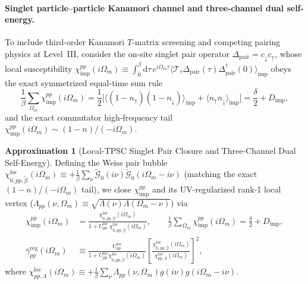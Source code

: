 \documentclass[11pt,a4paper]{article}
\numberwithin{equation}{section}
\theoremstyle{plain}
\theoremstyle{definition}
\newtheorem{approximation}{Approximation}[section]
\providecommand{\dd}{\mathrm{d}}
\begin{document}
\paragraph{Singlet particle--particle Kanamori channel and three-channel dual self-energy.}
To include third-order Kanamori $T$-matrix screening and competing pairing physics at
Level~III, consider the on-site singlet pair operator
$\Delta_{\mathrm{pair}} = c_\downarrow c_\uparrow$, whose local susceptibility
$\chi_{\mathrm{imp}}^{pp}(i\Omega_m) \equiv \int_0^\beta \dd\tau\, e^{i\Omega_m\tau}\langle \mathcal{T}_\tau \Delta_{\mathrm{pair}}(\tau)\Delta^\dagger_{\mathrm{pair}}(0)\rangle_{\mathrm{imp}}$
obeys the exact symmetrized equal-time sum rule
\begin{equation}
    \frac{1}{\beta}\sum_{\Omega_m} \chi_{\mathrm{imp}}^{pp}(i\Omega_m)
    = \frac{1}{2}\bigl[\langle (1 - n_\uparrow)(1 - n_\downarrow)\rangle_{\mathrm{imp}}
                       + \langle n_\uparrow n_\downarrow \rangle_{\mathrm{imp}}\bigr]
    = \frac{\delta}{2} + D_{\mathrm{imp}},
    \label{eq:pp_sumrule}
\end{equation}
and the exact commutator high-frequency tail
$\chi_{\mathrm{imp}}^{pp}(i\Omega_m) \sim (1 - n)/(-i\Omega_m)$.

\begin{approximation}[Local-TPSC Singlet Pair Closure and Three-Channel Dual Self-Energy]
Defining the Weiss pair bubble
$\chi_{0,pp,\tilde{\mathcal{G}}}^{\mathrm{loc}}(i\Omega_m) \equiv +\frac{1}{\beta}\sum_\nu \tilde{\mathcal{G}}_0(i\nu)\tilde{\mathcal{G}}_0(i\Omega_m - i\nu)$
(matching the exact $(1-n)/(-i\Omega_m)$ tail), we close $\chi_{\mathrm{imp}}^{pp}$ and
its UV-regularized rank-1 local vertex ($\Lambda_{pp}(\nu,\Omega_m) \equiv \sqrt{\Lambda(\nu)\Lambda(\Omega_m - \nu)}$)
via
\begin{align}
    \chi_{\mathrm{imp}}^{pp}(i\Omega_m)
    &= \frac{\chi_{0,pp,\tilde{\mathcal{G}}}^{\mathrm{loc}}(i\Omega_m)}
            {1 + U_{pp}^{\mathrm{loc}}\,\chi_{0,pp,\tilde{\mathcal{G}}}^{\mathrm{loc}}(i\Omega_m)},
    \qquad
    \frac{1}{\beta}\sum_{\Omega_m}\chi_{\mathrm{imp}}^{pp}(i\Omega_m) = \frac{\delta}{2} + D_{\mathrm{imp}},
    \label{eq:chi_pp_TPSC} \\
    \bar{\gamma}_{pp}^{\mathrm{reg}}(i\Omega_m)
    &\equiv \frac{U_{pp}^{\mathrm{loc}}}{1 + U_{pp}^{\mathrm{loc}}\chi_{0,pp,\tilde{\mathcal{G}}}^{\mathrm{loc}}(i\Omega_m)}
            \left[\frac{\chi_{0,pp,\tilde{\mathcal{G}}}^{\mathrm{loc}}(i\Omega_m)}
                       {\chi_{pp,\Lambda}^{\mathrm{loc}}(i\Omega_m)}\right]^2,
    \label{eq:gamma_pp_reg}
\end{align}
where $\chi_{pp,\Lambda}^{\mathrm{loc}}(i\Omega_m) \equiv +\frac{1}{\beta}\sum_\nu \Lambda_{pp}(\nu,\Omega_m)g(i\nu)g(i\Omega_m-i\nu)$.
\end{approximation}
\end{document}
